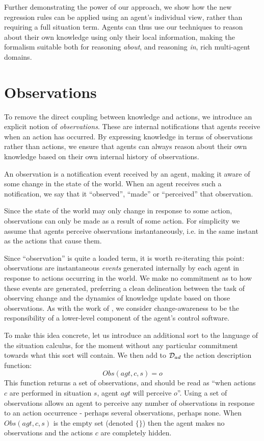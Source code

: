 Further demonstrating the power of our approach, we show how the new
regression rules can be applied using an agent's individual view,
rather than requiring a full situation term. Agents can thus use our
techniques to reason about their own knowledge using only their local
information, making the formalism suitable both for reasoning \emph{about},
and reasoning \emph{in}, rich multi-agent domains.


\section{Observations}

To remove the direct coupling between knowledge and actions, we introduce
an explicit notion of \emph{observations}. These are internal notifications
that agents receive when an action has occurred. By expressing knowledge
in terms of observations rather than actions, we ensure that agents
can always reason about their own knowledge based on their own internal
history of observations.

\begin{defnL}
[{Observations}] An observation is a notification event received
by an agent, making it aware of some change in the state of the world.
When an agent receives such a notification, we say that it {}``observed'',
{}``made'' or {}``perceived'' that observation. 
\end{defnL}
Since the state of the world may only change in response to some action,
observations can only be made as a result of some action. For simplicity
we assume that agents perceive observations instantaneously, i.e.
in the same instant as the actions that cause them.

Since {}``observation'' is quite a loaded term, it is worth re-iterating
this point: observations are instantaneous \emph{events} generated
internally by each agent in response to actions occurring in the world.
We make no commitment as to how these events are generated, preferring
a clean delineation between the task of observing change and the dynamics
of knowledge update based on those observations. As with the work
of \citep{scherl03sc_knowledge}, we consider change-awareness to
be the responsibility of a lower-level component of the agent's control
software.

To make this idea concrete, let us introduce an additional sort 
to the language of the situation calculus, for the moment without
any particular commitment towards what this sort will contain. We
then add to $\mathcal{D}_{ad}$ the action description function:\[
Obs(agt,c,s)=o\]
 This function returns a set of observations, and should be read as
{}``when actions $c$ are performed in situation $s$, agent $agt$
will perceive $o$''. Using a set of observations allows an agent
to perceive any number of observations in response to an action occurrence
- perhaps several observations, perhaps none. When $Obs(agt,c,s)$
is the empty set (denoted $\{\}$) then the agent makes no observations
and the actions $c$ are completely hidden.

